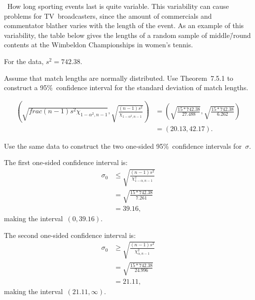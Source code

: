 \begin{problem}
  ~How long sporting events last is quite variable.  This variability can cause problems for TV~broadcasters, since the amount of commercials and commentator blather varies with the length of the event.  As an example of this variability, the table below gives the lengths of a random sample of middle\=/round contents at the Wimbeldon Championships in women's tennis.
\end{problem}

For the data, ${s^2 = 742.38}$.

\begin{subproblem}
  Assume that match lengths are normally distributed. Use Theorem~7.5.1 to construct a 95\%~confidence interval for the standard deviation of match lengths.
\end{subproblem}

\begin{align}
  \left(\sqrt{frac{(n-1)s^2}{\chi_{1-\alpha^2,n-1}}},\sqrt{\frac{(n-1)s^2}{\chi_{1-\alpha^2,n-1}}}\right) &= \left(\sqrt{\frac{15 * 742.38}{27.488}}, \sqrt{\frac{15 * 742.38}{6.262}}\right) \\
                                                                                                          &= \left(20.13,42.17\right)\text{.}
\end{align}

\begin{subproblem}
  Use the same data to construct the two one-sided 95\%~confidence intervals for~$\sigma$.
\end{subproblem}

The first one-sided confidence interval is:
\begin{align}
  \sigma_0 &\leq \sqrt{\frac{(n-1)  s^2}{\chi_{1- \alpha,n-1}^{2}}} \\
           &= \sqrt{\frac{15 * 742.38}{7.261}} \\
           &= 39.16 \text{,}
\end{align}
\noindent
making the interval~${(0, 39.16)}$.

The second one-sided confidence interval is:
\begin{align}
  \sigma_0 &\geq \sqrt{\frac{(n-1)  s^2}{\chi_{\alpha,n-1}^{2}}} \\
           &= \sqrt{\frac{15 * 742.38}{24.996}} \\
           &= 21.11 \text{,}
\end{align}
\noindent
making the interval~${(21.11,\infty)}$.
